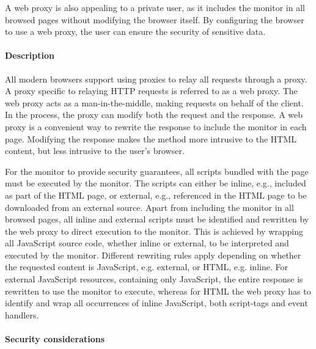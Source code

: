 \documentclass{llncs}
\newcommand{\todo}[1]{\colorbox{red}{\textcolor{white}{\sffamily\bfseries\scriptsize TODO}} \textcolor{red}{#1} \textcolor{red}{$\blacktriangleleft$}}
\begin{document}
A web proxy is also appealing to a private user, as it includes the monitor in all browsed pages without modifying 
the browser itself. By configuring the browser to use a web proxy, the user can ensure the security 
of sensitive data.

\paragraph{Description}
All modern browsers support using proxies to relay all requests through a proxy.
A proxy specific to relaying HTTP requests is referred to as a web proxy.
The web proxy acts as a man-in-the-middle, making 
requests on behalf of the client. In the process, the proxy can
modify both the request and the response. 
A web proxy is a convenient way to rewrite the response to include 
the monitor in each page. Modifying the response makes the method more 
intrusive to the HTML content, but less intrusive to the user's browser. 

For the monitor to provide security guarantees, all scripts bundled with 
the page must be executed by the monitor. The scripts can either be inline, 
e.g., included as part of the HTML page, or external, e.g., referenced in the 
HTML page to be downloaded from an external source.
Apart from including the monitor in all browsed pages, all inline and external 
scripts must be identified and rewritten by the web proxy to direct execution to the monitor.
This is achieved by wrapping all JavaScript source code, whether inline or 
external, to be interpreted and executed by the monitor.
Different rewriting rules apply depending on whether the 
requested content is JavaScript, e.g. external, or HTML, e.g. inline. 
For external 
JavaScript resources, containing only JavaScript, the entire response is rewritten to use the monitor to execute, whereas 
for HTML the web proxy has to identify and wrap all occurrences of inline 
JavaScript, both script-tags and event handlers.


\paragraph{Security considerations}
\end{document}
